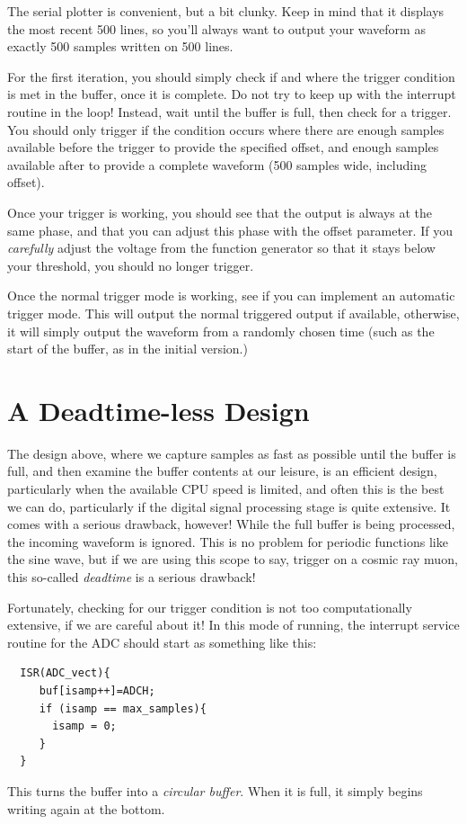 \documentclass[12pt]{article}
\begin{document}
The serial plotter is convenient, but a bit clunky.  Keep in mind that it displays the most recent 500 lines, so you'll always want to output your waveform as exactly 500 samples written on 500 lines.

For the first iteration, you should simply check if and where the trigger condition is met in the buffer, once it is complete.  Do not try to keep up with the interrupt routine in the loop!  Instead, wait until the buffer is full, then check for a trigger.  You should only trigger if the condition occurs where there are enough samples available before the trigger to provide the specified offset, and enough samples available after to provide a complete waveform (500 samples wide, including offset).

Once your trigger is working, you should see that the output is always at the same phase, and that you can adjust this phase with the offset parameter.  If you {\em carefully} adjust the voltage from the function generator so that it stays below your threshold, you should no longer trigger.

Once the normal trigger mode is working, see if you can implement an automatic trigger mode.  This will output the normal triggered output if available, otherwise, it will simply output the waveform from a randomly chosen time (such as the start of the buffer, as in the initial version.)

\section{A Deadtime-less Design}

The design above, where we capture samples as fast as possible until the buffer is full, and then examine the buffer contents at our leisure, is an efficient design, particularly when the available CPU speed is limited, and often this is the best we can do, particularly if the digital signal processing stage is quite extensive.  It comes with a serious drawback, however!  While the full buffer is being processed, the incoming waveform is ignored.  This is no problem for periodic functions like the sine wave, but if we are using this scope to say, trigger on a cosmic ray muon, this so-called {\em deadtime} is a serious drawback!

Fortunately, checking for our trigger condition is not too computationally extensive, if we are careful about it!  In this mode of running, the interrupt service routine for the ADC should start as something like this:
\begin{verbatim}
  ISR(ADC_vect){
     buf[isamp++]=ADCH;
     if (isamp == max_samples){
       isamp = 0;
     }  
  }
\end{verbatim}
This turns the buffer into a {\em circular buffer}.  When it is full, it simply begins writing again at the bottom.
\end{document}
